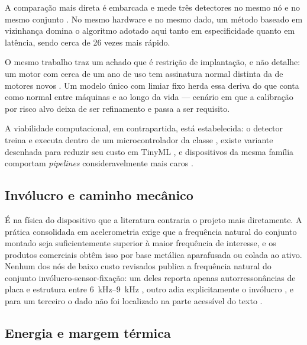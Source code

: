 A comparação mais direta é embarcada e mede três detectores no mesmo nó e no mesmo
conjunto \cite{chevtchenko2023}. No mesmo hardware e no mesmo dado, um método baseado em
vizinhança domina o algoritmo adotado aqui tanto em especificidade quanto em latência,
sendo cerca de \num{26} vezes mais rápido. 

O mesmo trabalho traz um achado que é restrição de implantação, e não detalhe: um motor com
cerca de um ano de uso tem assinatura normal distinta da de motores novos
\cite{chevtchenko2023}. Um modelo único com limiar fixo herda essa deriva do que conta como
normal entre máquinas e ao longo da vida --- cenário em que a calibração por risco alvo
deixa de ser refinamento e passa a ser requisito.

A viabilidade computacional, em contrapartida, está estabelecida: o detector treina e
executa dentro de um microcontrolador da classe \cite{antonini2023}, existe variante
desenhada para reduzir seu custo em TinyML \cite{barbariol2022}, e dispositivos da mesma
família comportam \emph{pipelines} consideravelmente mais caros \cite{uselis2025,kumar2026}.

\subsection{Invólucro e caminho mecânico}

É na física do dispositivo que a literatura contraria o projeto mais diretamente. A prática
consolidada em acelerometria exige que a frequência natural do conjunto montado seja
suficientemente superior à maior frequência de interesse, e os produtos comerciais obtêm
isso por base metálica aparafusada ou colada ao ativo. Nenhum dos nós de baixo custo
revisados publica a frequência natural do conjunto invólucro-sensor-fixação: um deles
reporta apenas autorressonâncias de placa e estrutura entre \SIrange{6}{9}{\kilo\hertz}
\cite{jakobsen2024}, outro adia explicitamente o invólucro \cite{antonini2023}, e para um
terceiro o dado não foi localizado na parte acessível do texto \cite{bisio2025}.

\subsection{Energia e margem térmica}


